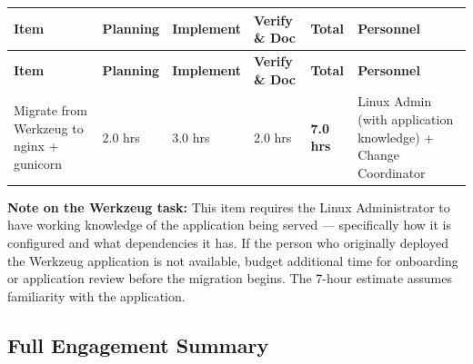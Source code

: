 \documentclass[12pt]{article}
\begin{document}
\bigskip
 
\noindent
\begin{longtable}{p{3.6cm} p{1.4cm} p{1.4cm} p{1.6cm} p{1.4cm} p{2.6cm}}
  \rowcolor{headercol}
  \color{white}\textbf{Item} &
  \color{white}\textbf{Planning} &
  \color{white}\textbf{Implement} &
  \color{white}\textbf{Verify \& Doc} &
  \color{white}\textbf{Total} &
  \color{white}\textbf{Personnel} \\
  \endfirsthead
  \rowcolor{headercol}
  \color{white}\textbf{Item} &
  \color{white}\textbf{Planning} &
  \color{white}\textbf{Implement} &
  \color{white}\textbf{Verify \& Doc} &
  \color{white}\textbf{Total} &
  \color{white}\textbf{Personnel} \\
  \endhead
  \midrule
 
  Migrate from Werkzeug to nginx + gunicorn &
  2.0 hrs &
  3.0 hrs &
  2.0 hrs &
  \textbf{7.0 hrs} &
  Linux Admin (with application knowledge) + Change Coordinator \\[4pt]
 
  \bottomrule
\end{longtable}
 
\begin{warnbox}
\textbf{Note on the Werkzeug task:} This item requires the Linux
Administrator to have working knowledge of the application being served ---
specifically how it is configured and what dependencies it has. If the
person who originally deployed the Werkzeug application is not available,
budget additional time for onboarding or application review before the
migration begins. The 7-hour estimate assumes familiarity with the
application.
\end{warnbox}
 
\subsection{Full Engagement Summary}
 
\bigskip
 
\end{document}
